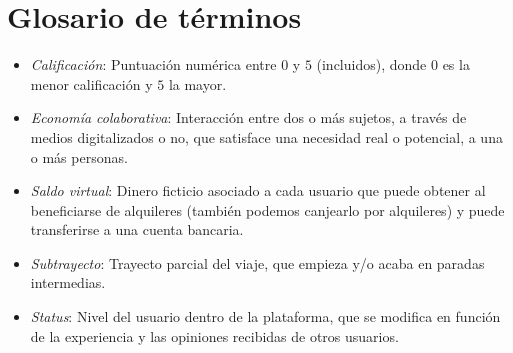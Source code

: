\documentclass[11pt,spanish]{article} %
\begin{document}
\section{Glosario de términos}
\begin{itemize}
	\item \textit{Calificación}: Puntuación numérica entre $0$ y $5$ (incluidos), donde $0$ es la menor calificación y $5$ la mayor.
	\item \textit{Economía colaborativa}: Interacción entre dos o más sujetos, a través de medios digitalizados o no, que satisface una necesidad real o potencial, a una o más personas.	
	\item \textit{Saldo virtual}: Dinero ficticio asociado a cada usuario que puede obtener al beneficiarse de alquileres (también podemos canjearlo por alquileres) y puede transferirse a una cuenta bancaria.
	\item \textit{Subtrayecto}: Trayecto parcial del viaje, que empieza y/o acaba en paradas intermedias.
	\item \textit{Status}: Nivel del usuario dentro de la plataforma, que se modifica en función de la experiencia y las opiniones recibidas de otros usuarios.
\end{itemize}










\end{document}
